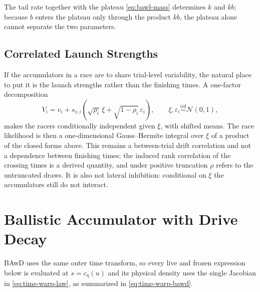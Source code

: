 \documentclass[12pt]{article}
\newcommand{\Normal}{\mathcal{N}}
\theoremstyle{remark}
\begin{document}
The tail rate together with the plateau \eqref{eq:bawl-mass} determines $k$ and $kb$; because $b$ enters the plateau only through the product $kb$, the plateau alone cannot separate the two parameters.

\subsection{Correlated Launch Strengths}
If the accumulators in a race are to share trial-level variability, the natural place to put it is the launch strengths rather than the finishing times. A one-factor decomposition
\begin{equation}
  V_i = v_i + s_{v,i}\left(\sqrt{\rho_i}\,\xi + \sqrt{1-\rho_i}\,\varepsilon_i\right),
  \qquad
  \xi, \varepsilon_i \stackrel{iid}{\sim} \Normal(0,1),
\end{equation}
makes the racers conditionally independent given $\xi$, with shifted means. The race likelihood is then a one-dimensional Gauss--Hermite integral over $\xi$ of a product of the closed forms above. This remains a between-trial drift correlation and not a dependence between finishing times; the induced rank correlation of the crossing times is a derived quantity, and under positive truncation $\rho$ refers to the untruncated draws. It is also not lateral inhibition: conditional on $\xi$ the accumulators still do not interact.

\section{Ballistic Accumulator with Drive Decay}
\label{sec:bawd}
BAwD uses the same outer time transform, so every live and frozen expression below is evaluated at \(s=c_\eta(u)\) and its physical density uses the single Jacobian in \eqref{eq:time-warp-law}, as summarized in
\eqref{eq:time-warp-bawd}.
\end{document}
